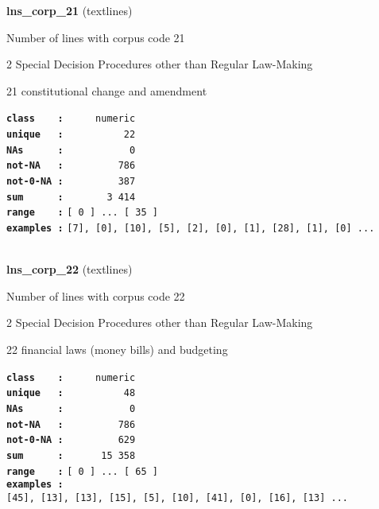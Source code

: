\documentclass[]{article}
\begin{document}
\textbf{lns\_corp\_21} (textlines)

Number of lines with corpus code 21

2 Special Decision Procedures other than Regular Law-Making

21 constitutional change and amendment

\textbf{\texttt{class\ \ \ \ :}} \texttt{~~~~~numeric}\\
\textbf{\texttt{unique\ \ \ :}} \texttt{~~~~~~~~~~22}\\
\textbf{\texttt{NAs\ \ \ \ \ \ :}} \texttt{~~~~~~~~~~~0}\\
\textbf{\texttt{not-NA\ \ \ :}} \texttt{~~~~~~~~~786}\\
\textbf{\texttt{not-0-NA\ :}} \texttt{~~~~~~~~~387}\\
\textbf{\texttt{sum\ \ \ \ \ \ :}} \texttt{~~~~~~~3~414}\\
\textbf{\texttt{range\ \ \ \ :}}
\texttt{{[}\ 0\ {]}\ ...\ {[}\ 35\ {]}}\\
\textbf{\texttt{examples\ :}}
\texttt{{[}7{]},\ {[}0{]},\ {[}10{]},\ {[}5{]},\ {[}2{]},\ {[}0{]},\ {[}1{]},\ {[}28{]},\ {[}1{]},\ {[}0{]}\ ...}\\

~

\textbf{lns\_corp\_22} (textlines)

Number of lines with corpus code 22

2 Special Decision Procedures other than Regular Law-Making

22 financial laws (money bills) and budgeting

\textbf{\texttt{class\ \ \ \ :}} \texttt{~~~~~numeric}\\
\textbf{\texttt{unique\ \ \ :}} \texttt{~~~~~~~~~~48}\\
\textbf{\texttt{NAs\ \ \ \ \ \ :}} \texttt{~~~~~~~~~~~0}\\
\textbf{\texttt{not-NA\ \ \ :}} \texttt{~~~~~~~~~786}\\
\textbf{\texttt{not-0-NA\ :}} \texttt{~~~~~~~~~629}\\
\textbf{\texttt{sum\ \ \ \ \ \ :}} \texttt{~~~~~~15~358}\\
\textbf{\texttt{range\ \ \ \ :}}
\texttt{{[}\ 0\ {]}\ ...\ {[}\ 65\ {]}}\\
\textbf{\texttt{examples\ :}}
\texttt{{[}45{]},\ {[}13{]},\ {[}13{]},\ {[}15{]},\ {[}5{]},\ {[}10{]},\ {[}41{]},\ {[}0{]},\ {[}16{]},\ {[}13{]}\ ...}\\

~
\end{document}
